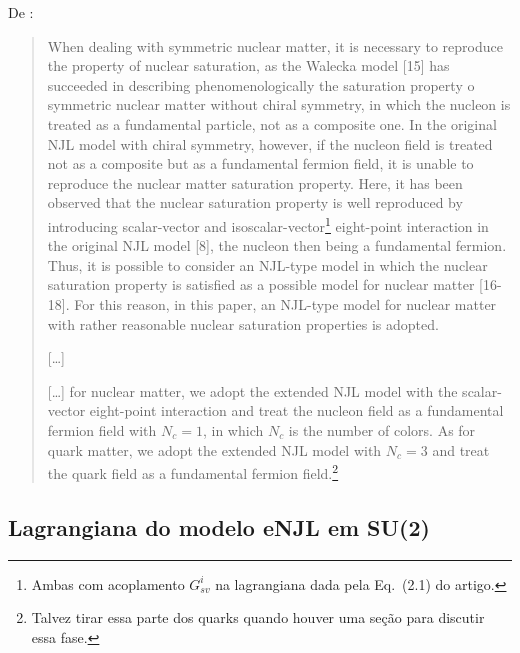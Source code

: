 %
De \textcite{japoneses}:
\begin{quote}
	When dealing with symmetric nuclear matter, it is necessary to reproduce the property of nuclear saturation, as the Walecka model [15] has succeeded in describing phenomenologically the saturation property o symmetric nuclear matter without chiral symmetry, in which the nucleon is treated as a fundamental particle, not as a composite one. In the original NJL model with chiral symmetry, however, if the nucleon field is treated not as a composite but as a fundamental fermion field, it is unable to reproduce the nuclear matter saturation property. Here, it has been observed that the nuclear saturation property is well reproduced by introducing scalar-vector and isoscalar-vector\footnote{Ambas com acoplamento $G_{sv}^i$ na lagrangiana dada pela Eq.~(2.1) do artigo.} eight-point interaction in the original NJL model [8], the nucleon then being a fundamental fermion. Thus, it is possible to consider an NJL-type model in which the nuclear saturation property is satisfied as a possible model for nuclear matter [16-18]. For this reason, in this paper, an NJL-type model for nuclear matter with rather reasonable nuclear saturation properties is adopted.
	
	[\dots]
	
	[\dots] for nuclear matter, we adopt the extended NJL model with the scalar-vector eight-point interaction and treat the nucleon field as a fundamental fermion field with $N_c = 1$, in which $N_c$ is the number of colors. As for quark matter, we adopt the extended NJL model with $N_c = 3$ and treat the quark field as a fundamental fermion field.\footnote{Talvez tirar essa parte dos quarks quando houver uma seção para discutir essa fase.}
\end{quote}


\subsection{Lagrangiana do modelo eNJL em SU(2)}


